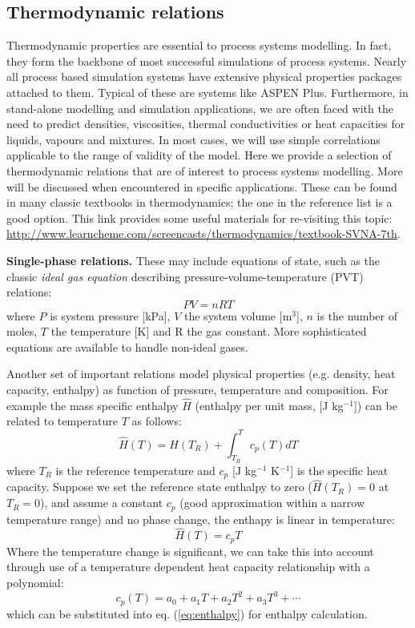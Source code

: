 \documentclass[a4paper,11pt]{article}
\theoremstyle{definition}
\begin{document}
\subsection{Thermodynamic relations}

Thermodynamic properties are essential to process systems modelling.
In fact, they form the backbone of most successful simulations of process systems.
Nearly all process based simulation systems have extensive physical properties packages attached to them.
Typical of these are systems like ASPEN Plus. Furthermore, in stand-alone modelling and simulation applications,
we are often faced with the need to predict densities, viscosities, thermal conductivities or heat capacities for liquids, vapours and mixtures. 
In most cases, we will use simple correlations applicable to the range of validity of the model. Here we provide a selection of
thermodynamic relations that are of interest to process systems modelling. More will be discussed when encountered in specific
applications. These can be found in many classic textbooks in thermodynamics; the one in the reference list is a good option.
This link provides some useful materials for re-visiting this topic: \url{http://www.learncheme.com/screencasts/thermodynamics/textbook-SVNA-7th}.

\textbf{Single-phase relations.} These may include equations of state, such as the classic \emph{ideal gas equation} describing pressure-volume-temperature (PVT)
relations:
\begin{equation}
	P V = n R T
\end{equation}
\noindent where $P$ is system pressure [kPa], $V$ the system volume [m$^3$], $n$ is the number of moles, 
$T$ the temperature [K] and R the gas constant. More sophisticated equations are available
to handle non-ideal gases.

Another set of important relations model physical properties (e.g. density, heat capacity, enthalpy) as function of 
pressure, temperature and composition. For example the mass specific enthalpy $\hat{H}$
(enthalpy per unit mass, [J kg$^{-1}$]) can be related to temperature $T$ as follows:
\begin{equation} \label{eq:enthalpy}
	\hat{H}(T) = \hat{H}(T_R) + \int_{T_R}^T c_p(T) d T
\end{equation}
\noindent where $T_R$ is the reference temperature and $c_p$ [J kg$^{-1}$ K$^{-1}$] is the specific heat capacity. Suppose we set the reference state enthalpy
to zero ($\hat{H}(T_R)=0$ at $T_R=0$), and assume a constant $c_p$ (good approximation within a narrow temperature range) and no phase change,
the enthapy is linear in temperature: 
\begin{equation}
	\hat{H}(T) = c_p T
\end{equation}
\noindent Where the temperature change is significant, we can take this into account
through use of a temperature dependent heat capacity relationship with a polynomial:
\begin{equation}
	c_p(T) = a_0 + a_1 T + a_2 T^2 + a_3 T^3 + \cdots
\end{equation}
\noindent which can be substituted into eq. (\ref{eq:enthalpy}) for enthalpy calculation.
\end{document}
